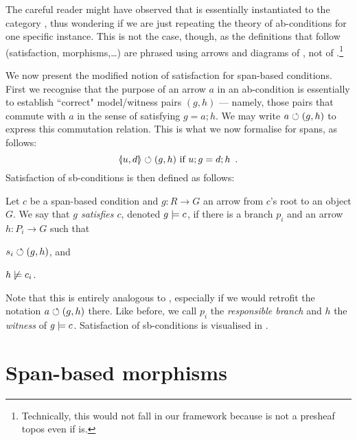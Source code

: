 \medskip\noindent The careful reader might have observed that  is essentially  instantiated to the category {\SpanC}, thus wondering if we are just repeating the theory of ab-conditions for one specific instance. This is not the case, though, as the definitions that follow (satisfaction, morphisms,\ldots) are phrased using arrows and diagrams of , not of {\SpanC}.\footnote{Technically, this would not fall in our framework because {\SpanC} is not a presheaf topos even if  is.}

We now present the modified notion of satisfaction for span-based conditions. First we recognise that the purpose of an arrow $a$ in an ab-condition is essentially to establish ``correct" model/witness pairs $(g,h)$ --- namely, those pairs that commute with $a$ in the sense of satisfying $g=a;h$. We may write $a\circlearrowleft (g,h)$ to express this commutation relation. This is what we now formalise for spans, as follows:
\[ \spanof u d \commutes (g,h) \text{ if } u;g=d;h \enspace. \]
Satisfaction of sb-conditions is then defined as follows:

\begin{definition}
  Let $c$ be a span-based condition and $g:R\to G$ an arrow from $c$'s root to an object $G$. We say that \emph{$g$ satisfies $c$}, denoted $g\models c$, if there is a branch $p_i$ and an arrow $h:P_i\to G$ such that
  \begin{enumerate*}
  \item $s_i \circlearrowleft (g, h)$, and
  \item $h\not\models c_i$.
  \end{enumerate*}
\end{definition}
%
Note that this is entirely analogous to , especially if we would retrofit the notation $a\circlearrowleft (g,h)$ there. Like before, we call $p_i$ the \emph{responsible branch} and $h$ the \emph{witness} of $g\models c$. Satisfaction of sb-conditions is visualised in .

\section{Span-based morphisms}

